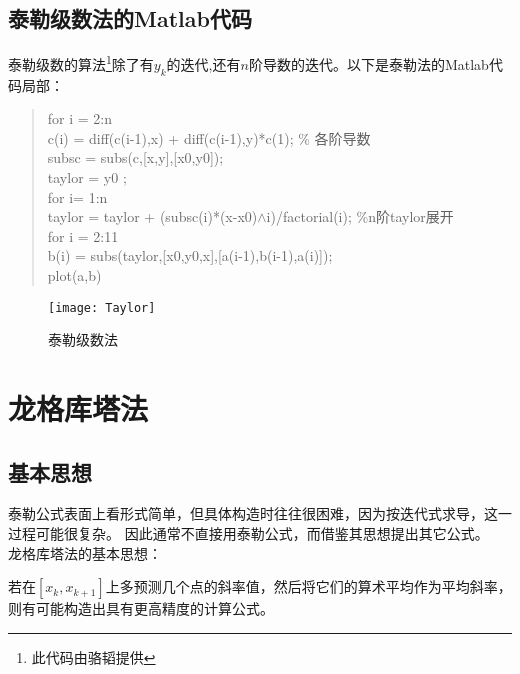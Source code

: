 \documentclass[a4paper,12pt]{article}
\begin{document}
\subsection{泰勒级数法的Matlab代码}
泰勒级数的算法\footnote{此代码由骆韬提供}除了有$y_k$的迭代,还有$n$阶导数的迭代。以下是泰勒法的Matlab代码局部：
\begin{quote}
\small{
for i = 2:n\\
c(i) = diff(c(i-1),x) + diff(c(i-1),y)*c(1); \% 各阶导数\\
subsc = subs(c,[x,y],[x0,y0]);\\
taylor = y0 ;\\
for i= 1:n\\
   taylor = taylor + (subsc(i)*(x-x0)$\wedge$i)/factorial(i);  \%n阶taylor展开\\
for i = 2:11\\
    b(i) = subs(taylor,[x0,y0,x],[a(i-1),b(i-1),a(i)]);\\
plot(a,b)\\
}
\end{quote}
\begin{figure}[thispage]
\centering
\texttt{[image: Taylor]}\\
\caption{泰勒级数法}
\end{figure}

\section{龙格库塔法}
\subsection{基本思想}
泰勒公式表面上看形式简单，但具体构造时往往很困难，因为按迭代式求导，这一过程可能很复杂。
因此通常不直接用泰勒公式，而借鉴其思想提出其它公式。\\
龙格库塔法的基本思想：\par
若在$[x_k, x_{k+1}]$上多预测几个点的斜率值，然后将它们的算术平均作为平均斜率，则有可能构造出具有更高精度的计算公式。
\end{document}
